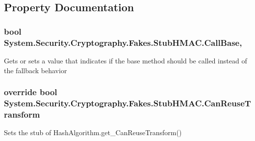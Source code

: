 \subsection{Property Documentation}
\hypertarget{class_system_1_1_security_1_1_cryptography_1_1_fakes_1_1_stub_h_m_a_c_ab6c10a126e4502926c930decae69c254}{
\subsubsection[{Call\-Base}]{\setlength{\rightskip}{0pt plus 5cm}bool System.\-Security.\-Cryptography.\-Fakes.\-Stub\-H\-M\-A\-C.\-Call\-Base\hspace{0.3cm}{\ttfamily [get]}, {\ttfamily [set]}}}\label{class_system_1_1_security_1_1_cryptography_1_1_fakes_1_1_stub_h_m_a_c_ab6c10a126e4502926c930decae69c254}


Gets or sets a value that indicates if the base method should be called instead of the fallback behavior

\hypertarget{class_system_1_1_security_1_1_cryptography_1_1_fakes_1_1_stub_h_m_a_c_ab484da6b803c5af35e83d9fc80e05ae6}{
\subsubsection[{Can\-Reuse\-Transform}]{\setlength{\rightskip}{0pt plus 5cm}override bool System.\-Security.\-Cryptography.\-Fakes.\-Stub\-H\-M\-A\-C.\-Can\-Reuse\-Transform\hspace{0.3cm}{\ttfamily [get]}}}\label{class_system_1_1_security_1_1_cryptography_1_1_fakes_1_1_stub_h_m_a_c_ab484da6b803c5af35e83d9fc80e05ae6}


Sets the stub of Hash\-Algorithm.\-get\-\_\-\-Can\-Reuse\-Transform()

